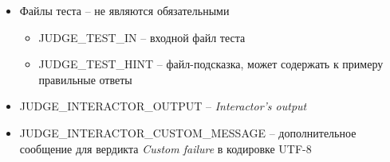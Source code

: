 \begin{itemize}
    \item Файлы теста -- не являются обязательными
        \begin{itemize}
            \item JUDGE\_TEST\_IN -- входной файл теста
            \item JUDGE\_TEST\_HINT -- файл-подсказка, может содержать к примеру правильные ответы
        \end{itemize}
    \item JUDGE\_INTERACTOR\_OUTPUT -- \textit{Interactor's output}
    \item JUDGE\_INTERACTOR\_CUSTOM\_MESSAGE -- дополнительное сообщение для вердикта \textit{Custom failure}
        в кодировке UTF-8
\end{itemize}

